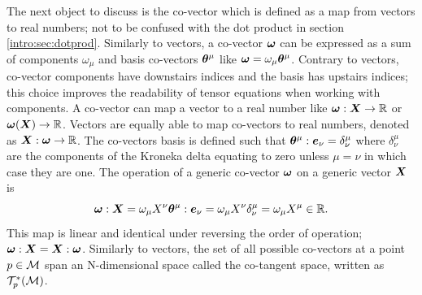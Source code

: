 The next object to discuss is the co-vector which is defined as a map from vectors to real numbers; not to be confused with the dot product in section \ref{intro:sec:dotprod}. Similarly to vectors, a co-vector $\boldsymbol{\omega}$ can be expressed as a sum of components $\omega_\mu$ and basis co-vectors $\boldsymbol{\theta}^\mu$ like $\boldsymbol{\omega} = \omega_\mu \boldsymbol{\theta}^\mu$. Contrary to vectors, co-vector components have downstairs indices and the basis has upstairs indices; this choice improves the readability of tensor equations when working with components. A co-vector can map a vector to a real number like $\boldsymbol{\omega}:\boldsymbol{X} \rightarrow \mathbb{R}$ or $\boldsymbol{\omega}(\boldsymbol{X}) \rightarrow \mathbb{R}$. Vectors are equally able to map co-vectors to real numbers, denoted as $\boldsymbol{X}:\boldsymbol{\omega}\rightarrow\mathbb{R}$. {\color{orchid}The co-vectors basis is} defined such that $\boldsymbol{\theta}^\mu : \boldsymbol{e}_\nu = \delta^\mu_\nu$ where $\delta^\mu_\nu$ are the components of the Kroneka delta equating to zero unless $\mu=\nu$ in which case they are one. The operation of a generic co-vector $\boldsymbol{\omega}$ on a generic vector $\boldsymbol{X}$ is
\begin{equation}
\boldsymbol{\omega}: \boldsymbol{X} = \omega_\mu X^\nu \boldsymbol{\theta}^\mu:\boldsymbol{e}_\nu = \omega_\mu X^\nu \delta^\mu_\nu = \omega_\mu X^\mu \in \mathbb{R}.
\end{equation}
This map is linear and identical under reversing the order of operation; $\boldsymbol{\omega} : \boldsymbol{X} = \boldsymbol{X} : \boldsymbol{\omega}$. Similarly to vectors, the set of all possible co-vectors at a point $p\in\mathcal{M}$ span an N-dimensional space called the co-tangent space, written as $\mathcal{T}^*_p(\mathcal{M})$. 

